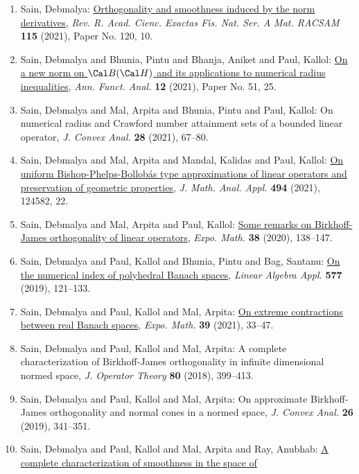 \begin{enumerate}
\item Sain, Debmalya: \href{https://doi.org/10.1007/s13398-021-01060-0}{Orthogonality and smoothness induced by the norm derivatives}, \emph{Rev. R. Acad. Cienc. Exactas F\'{\i}s. Nat. Ser. A Mat. RACSAM} {\bf 115} (2021), Paper No. 120, 10.
\item Sain, Debmalya and Bhunia, Pintu and Bhanja, Aniket and Paul,
Kallol: \href{https://doi.org/10.1007/s43034-021-00138-5}{On a new norm on {$\Cal B(\Cal H)$} and its applications to
numerical radius inequalities}, \emph{Ann. Funct. Anal.} {\bf 12} (2021), Paper No. 51, 25.
\item Sain, Debmalya and Mal, Arpita and Bhunia, Pintu and Paul,
Kallol: On numerical radius and {C}rawford number attainment sets of a
bounded linear operator, \emph{J. Convex Anal.} {\bf 28} (2021), 67--80.
\item Sain, Debmalya and Mal, Arpita and Mandal, Kalidas and Paul,
Kallol: \href{https://doi.org/10.1016/j.jmaa.2020.124582}{On uniform {B}ishop-{P}helps-{B}ollob\'{a}s type approximations of
linear operators and preservation of geometric properties}, \emph{J. Math. Anal. Appl.} {\bf 494} (2021), 124582, 22.
\item Sain, Debmalya and Mal, Arpita and Paul, Kallol: \href{https://doi.org/10.1016/j.exmath.2019.01.001}{Some remarks on {B}irkhoff-{J}ames orthogonality of linear
operators}, \emph{Expo. Math.} {\bf 38} (2020), 138--147.
\item Sain, Debmalya and Paul, Kallol and Bhunia, Pintu and Bag,
Santanu: \href{https://doi.org/10.1016/j.laa.2019.04.024}{On the numerical index of polyhedral {B}anach spaces}, \emph{Linear Algebra Appl.} {\bf 577} (2019), 121--133.
\item Sain, Debmalya and Paul, Kallol and Mal, Arpita: \href{https://doi.org/10.1016/j.exmath.2019.09.004}{On extreme contractions between real {B}anach spaces}, \emph{Expo. Math.} {\bf 39} (2021), 33--47.
\item Sain, Debmalya and Paul, Kallol and Mal, Arpita: A complete characterization of {B}irkhoff-{J}ames
orthogonality in infinite dimensional normed space, \emph{J. Operator Theory} {\bf 80} (2018), 399--413.
\item Sain, Debmalya and Paul, Kallol and Mal, Arpita: On approximate {B}irkhoff-{J}ames orthogonality and normal
cones in a normed space, \emph{J. Convex Anal.} {\bf 26} (2019), 341--351.
\item Sain, Debmalya and Paul, Kallol and Mal, Arpita and Ray,
Anubhab: \href{https://doi.org/10.1080/03081087.2019.1586824}{A complete characterization of smoothness in the space of
}
\end{enumerate}
